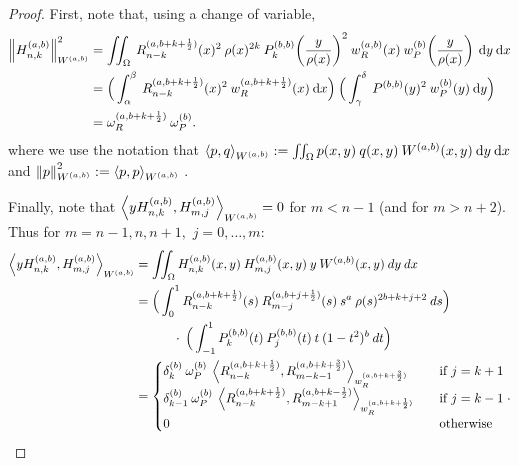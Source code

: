 \documentclass[11pt, oneside]{article}   	%
\newcommand{\half}{\frac{1}{2}}
\newcommand{\hdop}{H}
\newcommand{\hdopnkab}{\hdop_{n,k}^{(a,b)}}
\newcommand{\Wab}{{W^{(a,b)}}}
\newcommand{\hdopmjab}{\hdop_{m,j}^{(a,b)}}
\newcommand{\genjac}{R}
\newcommand{\genjacnmk}{\genjac_{n-k}}
\newcommand{\genjacmmj}{\genjac_{m-j}}
\newcommand{\genjacw}{w_\genjac}
\newcommand{\normgenjac}{\omega_\genjac}
\newcommand{\normjac}{\omega_P}
\begin{document}
\begin{proof}
First, note that, using a change of variable,
\begin{align*}
	\norm{\hdopnkab}_\Wab^2 &= \iint_\Omega \: {\genjacnmk^{(a,b+k+\half)}}(x)^2 \: \rho(x)^{2k} \: {P_k^{(b,b)}\fpr(\frac{y}{\rho(x)})^2} \: \genjacw^{(a,b)}(x) \: w_P^{(b)}\fpr(\frac{y}{\rho(x)}) \: \D y \: \D x \nonumber \\
	&= \Big( \int_\alpha^\beta \: {\genjacnmk^{(a,b+k+\half)}}(x)^2 \: \genjacw^{(a,b+k+\half)}(x) \: \D x \Big) \: \Big( \int_\gamma^\delta \: {P^{(b,b)}}(y)^2 \: w_P^{(b)}(y) \: \D y \Big) \nonumber \\
	&= \normgenjac^{(a,b+k+\half)} \: \normjac^{(b)}.
\end{align*}
where we use the notation that $\ip<p, q>_{\Wab} := \iint_\Omega p(x,y) \: q(x,y) \: \Wab(x,y) \: \D y \: \D x$ and $\norm{p}_{W^{(a,b)}}^2 := \ip<p, p>_{\Wab}$ .

Finally, note that \(\ip<y \hdopnkab, \hdopmjab>_\Wab = 0\) for \(m < n-1\) (and for \(m > n+2\)). Thus for \(m = n-1, n, n+1,\) \(j = 0,\dots,m:\)
\begin{align*}
\ip<y \hdopnkab, \hdopmjab>_\Wab &=  \iint_\Omega \hdopnkab(x,y) \: \hdopmjab(x,y) \: y \: \Wab(x,y) \: dy \: dx \\
&= \Big( \int^1_0 \genjacnmk^{(a, b+k+\half)}(s) \: \genjacmmj^{(a, b+j+\half)}(s) \: s^a \: \rho(s)^{2b+k+j+2} \: ds \Big) \nonumber \\
& \quad \quad \quad\cdot \: \Big( \int^1_{-1} P_k^{(b,b)}(t) \: P_j^{(b,b)}(t) \: t \: (1-t^2)^b \: dt \Big) \\
&= \begin{cases}
    	\delta_k^{(b)} \: \normjac^{(b)} \: \ip<\genjacnmk^{(a, b+k+\half)}, \genjac_{m-k-1}^{(a, b+k+\frac{3}{2})}>_{\genjacw^{(a, b+k+\frac{3}{2})}} \quad& \text{if } j = k+1 \\
	\delta_{k-1}^{(b)} \: \normjac^{(b)} \: \ip<\genjacnmk^{(a, b+k+\half)}, \genjac_{m-k+1}^{(a, b+k-\half)}>_{\genjacw^{(a, b+k+\half)}} \quad& \text{if } j = k-1 \\
	0 & \text{otherwise}
      \end{cases}.
\end{align*}

\end{proof}
\end{document}
